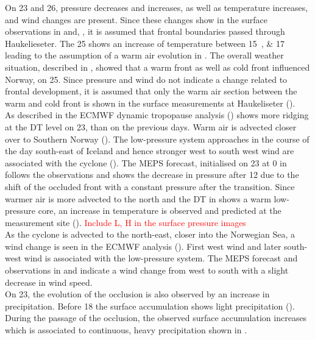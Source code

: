 On \num{23} and \SI{26}{\dec}, pressure decreases and increases, as well as temperature increases, and wind changes are present. Since these changes show in the surface observations in  and, , it is assumed that frontal boundaries passed through Haukelieseter. The \SI{25}{\dec} shows an increase of temperature between \SIlist{15;17}{\UTC} leading to the assumption of a warm air evolution in . The overall weather situation, described in , showed that a warm front as well as cold front influenced Norway, on \SI{25}{\dec}. Since pressure and wind do not indicate a change related to frontal development, it is assumed that only the warm air section between the warm and cold front is shown in the surface measurements at Haukeliseter ().   
\\
As described in  the ECMWF dynamic tropopause analysis () shows more ridging at the DT level on \SI{23}{\dec}, than on the previous days. Warm air is advected closer over to Southern Norway (). The low-pressure system approaches in the course of the day south-east of Iceland and hence stronger west to south west wind are associated with the cyclone (). The MEPS forecast, initialised on \SI{23}{\dec} at \SI{0}{\UTC} in  follows the observations and shows the decrease in pressure after \SI{12}{\UTC} due to the shift of the occluded front with a constant pressure after the transition. Since warmer air is more advected to the north and the DT in  shows a warm low-pressure core, an increase in temperature is observed and predicted at the measurement site (). \textcolor{red}{Include L, H in the surface pressure images}
\\
As the cyclone is advected to the north-east, closer into the Norwegian Sea, a wind change is seen in the ECMWF analysis (). First west wind and later south-west wind is associated with the low-pressure system. The MEPS forecast and observations in  and  indicate a wind change from west to south with a slight decrease in wind speed.
\\
On \SI{23}{\dec}, the evolution of the occlusion is also observed by an increase in precipitation. Before \SI{18}{\UTC} the surface accumulation shows light precipitation (). During the passage of the occlusion, the observed surface accumulation increases which is associated to continuous, heavy precipitation shown in .
